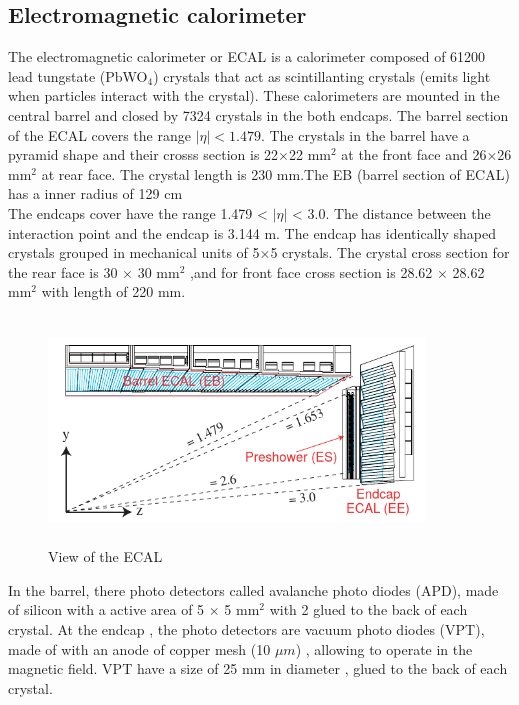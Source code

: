 \subsection{Electromagnetic calorimeter}

The electromagnetic calorimeter or ECAL is a calorimeter composed of 61200 lead tungstate (PbWO$_4$) crystals that act as scintillanting crystals (emits light when particles interact with the crystal). These calorimeters are mounted in the central barrel and closed by 7324 crystals in the both endcaps. The barrel section  of the ECAL covers the range $|\eta| < 1.479$. The crystals in the barrel have a pyramid shape and their crosss section is 22$\times$22 mm$^2$ at the front face and 26$\times$26 mm$^2$ at rear face. The crystal length is 230 mm.The EB (barrel section of ECAL) has a inner radius of 129 cm\cite{cms-manual}\\

The endcaps cover have the  range 1.479 < $|\eta|$ < 3.0. The distance between the interaction point and the endcap is 3.144 m. The endcap has  identically shaped crystals grouped in
mechanical units of 5×5 crystals. The crystal cross section for the rear face is 30 $\times$ 30 mm$^2$ ,and for front face cross section is 28.62 $\times$ 28.62 mm$^2$ with length of 220 mm.
\\
\begin{figure}[!htbp]
	\centering
	\includegraphics[width=10cm,height=6cm]{Chapter2/ecal.png}
	\caption{View of the ECAL\cite{cms-manual}}\label{ecal}
\end{figure}
In the barrel, there photo detectors called avalanche photo diodes (APD), made of silicon with a active area of  5 $\times$ 5 mm$^2$ with 2 glued to the back of each crystal.  At the endcap , the photo detectors are vacuum photo diodes (VPT), made of with an anode of copper mesh (10 $\mu m$) , allowing to operate in the magnetic field. VPT have a size of 25 mm in diameter , glued to the back of each crystal.\\


